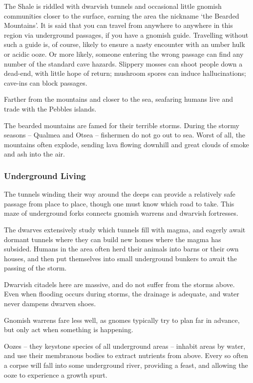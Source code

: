 \begin{multicols}{2}
The Shale is riddled with dwarvish tunnels and occasional little gnomish communities closer to the surface, earning the area the nickname `the Bearded Mountains'.
It is said that you can travel from anywhere to anywhere in this region via underground passages, if you have a gnomish guide.
Travelling without such a guide is, of course, likely to ensure a nasty encounter with an umber hulk or acidic ooze.
Or more likely, someone entering the wrong passage can find any number of the standard cave hazards.
Slippery mosses can shoot people down a dead-end, with little hope of return; mushroom spores can induce hallucinations; cave-ins can block passages.

Farther from the mountains and closer to the sea, seafaring humans live and trade with the Pebbles islands.

The bearded mountains are famed for their terrible storms.
During the stormy seasons -- Qualmea and Otsea -- fishermen do not go out to sea.
Worst of all, the mountains often explode, sending lava flowing downhill and great clouds of smoke and ash into the air.

\subsubsection{Underground Living}

The tunnels winding their way around the deeps can provide a relatively safe passage from place to place, though one must know which road to take.
This maze of underground forks connects gnomish warrens and dwarvish fortresses.

The dwarves extensively study which tunnels fill with magma, and eagerly await dormant tunnels where they can build new homes where the magma has subsided.
Humans in the area often herd their animals into barns or their own houses, and then put themselves into small underground bunkers to await the passing of the storm.

Dwarvish citadels here are massive, and do not suffer from the storms above.
Even when flooding occurs during storms, the drainage is adequate, and water never dampens dwarven shoes.

Gnomish warrens fare less well, as gnomes typically try to plan far in advance, but only act when something is happening.

Oozes -- they keystone species of all underground areas -- inhabit areas by water, and use their membranous bodies to extract nutrients from above.
Every so often a corpse will fall into some underground river, providing a feast, and allowing the ooze to experience a growth spurt.


\end{multicols}
